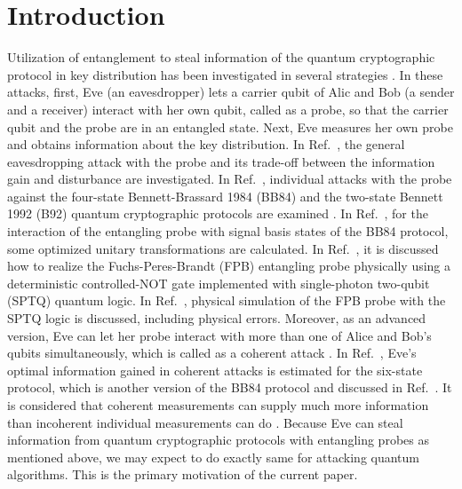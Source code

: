 \documentclass[12pt]{article}
\begin{document}
\section{\label{section-introduction}Introduction}
Utilization of entanglement to steal information of the quantum cryptographic protocol in key distribution
has been investigated in several strategies
\cite{Fuchs1996,Slutsky1998,Brandt2005,Shapiro2006,Kim2007}.
In these attacks,
first,
Eve (an eavesdropper) lets a carrier qubit of Alic and Bob (a sender and a receiver) interact with her own qubit,
called as a probe,
so that the carrier qubit and the probe are in an entangled state.
Next,
Eve measures her own probe and obtains information about the key distribution.
In Ref.~\cite{Fuchs1996},
the general eavesdropping attack with the probe and its trade-off between the information gain and disturbance are investigated.
In Ref.~\cite{Slutsky1998},
individual attacks with the probe
against the four-state Bennett-Brassard 1984 (BB84) and the two-state Bennett 1992 (B92) quantum cryptographic protocols are examined
\cite{Bennett1984,Bennett1992}.
In Ref.~\cite{Brandt2005},
for the interaction of the entangling probe with signal basis states of the BB84 protocol,
some optimized unitary transformations are calculated.
In Ref.~\cite{Shapiro2006},
it is discussed how to realize the Fuchs-Peres-Brandt (FPB) entangling probe physically
using a deterministic controlled-NOT gate implemented with single-photon two-qubit (SPTQ) quantum logic.
In Ref.~\cite{Kim2007},
physical simulation of the FPB probe with the SPTQ logic is discussed,
including physical errors.
Moreover,
as an advanced version,
Eve can let her probe interact with more than one of Alice and Bob's qubits simultaneously,
which is called as a coherent attack
\cite{Cirac1997}.
In Ref.~\cite{Hwang2001},
Eve's optimal information gained in coherent attacks is estimated for the six-state protocol,
which is another version of the BB84 protocol and discussed in Ref.~\cite{Bruss1998}.
It is considered that coherent measurements can supply much more information than incoherent individual measurements can do
\cite{Massar1995}.
Because Eve can steal information from quantum cryptographic protocols with entangling probes as mentioned above,
we may expect to do exactly same for attacking quantum algorithms.
This is the primary motivation of the current paper.
\end{document}
